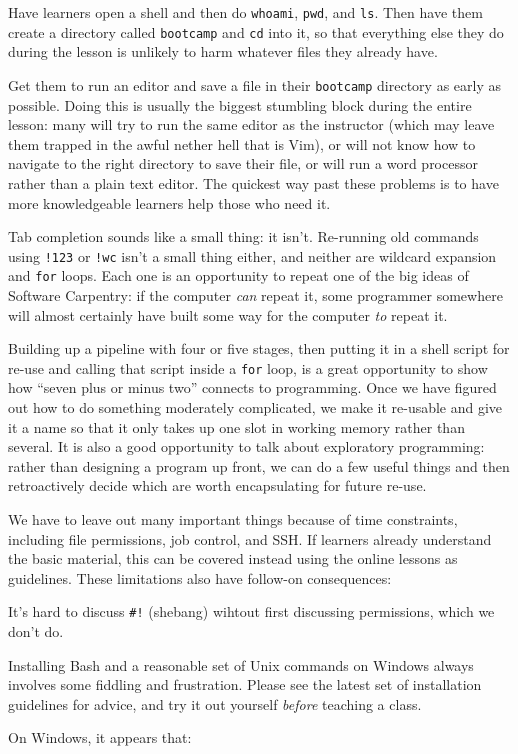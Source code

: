 \documentclass{book}
\begin{document}
\begin{swcitemize}
\item
  Have learners open a shell and then do \texttt{whoami}, \texttt{pwd},
  and \texttt{ls}. Then have them create a directory called
  \texttt{bootcamp} and \texttt{cd} into it, so that everything else
  they do during the lesson is unlikely to harm whatever files they
  already have.
\item
  Get them to run an editor and save a file in their \texttt{bootcamp}
  directory as early as possible. Doing this is usually the biggest
  stumbling block during the entire lesson: many will try to run the
  same editor as the instructor (which may leave them trapped in the
  awful nether hell that is Vim), or will not know how to navigate to
  the right directory to save their file, or will run a word processor
  rather than a plain text editor. The quickest way past these problems
  is to have more knowledgeable learners help those who need it.
\item
  Tab completion sounds like a small thing: it isn't. Re-running old
  commands using \texttt{!123} or \texttt{!wc} isn't a small thing
  either, and neither are wildcard expansion and \texttt{for} loops.
  Each one is an opportunity to repeat one of the big ideas of Software
  Carpentry: if the computer \emph{can} repeat it, some programmer
  somewhere will almost certainly have built some way for the computer
  \emph{to} repeat it.
\item
  Building up a pipeline with four or five stages, then putting it in a
  shell script for re-use and calling that script inside a \texttt{for}
  loop, is a great opportunity to show how ``seven plus or minus two''
  connects to programming. Once we have figured out how to do something
  moderately complicated, we make it re-usable and give it a name so
  that it only takes up one slot in working memory rather than several.
  It is also a good opportunity to talk about exploratory programming:
  rather than designing a program up front, we can do a few useful
  things and then retroactively decide which are worth encapsulating for
  future re-use.
\item
  We have to leave out many important things because of time
  constraints, including file permissions, job control, and SSH. If
  learners already understand the basic material, this can be covered
  instead using the online lessons as guidelines. These limitations also
  have follow-on consequences:
\item
  It's hard to discuss \texttt{\#!} (shebang) wihtout first discussing
  permissions, which we don't do.
\item
  Installing Bash and a reasonable set of Unix commands on Windows
  always involves some fiddling and frustration. Please see the latest
  set of installation guidelines for advice, and try it out yourself
  \emph{before} teaching a class.
\item
  On Windows, it appears that:


\end{swcitemize}
\end{document}
